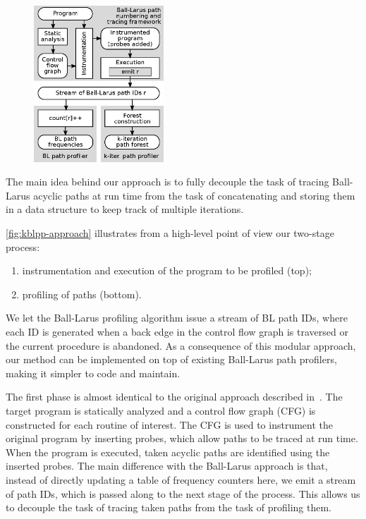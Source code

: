 \ifdefined\noauthorea
\begin{figure}
\vspace{-3mm}
\centering
\includegraphics[width=0.433\textwidth]{figures/kblpp-approach/kblpp-approach.eps}
\captionsetup{width=.47\textwidth}
\caption{\protect}
\end{figure}
\noindent
\fi

\vspace{-2mm}
\noindent The main idea behind our approach is to fully decouple the task of tracing Ball-Larus acyclic paths at run time from the task of concatenating and storing them in a data structure to keep track of multiple iterations.

\myfigure\ref{fig:kblpp-approach} illustrates from a high-level point of view our two-stage process:
\begin{enumerate}[parsep=0pt,itemsep=3pt,topsep=5pt]
\item instrumentation and execution of the program to be profiled (top);
\item profiling of paths (bottom).
\end{enumerate}
We let the Ball-Larus profiling algorithm issue a stream of BL path IDs, where each ID is generated when a back edge in the control flow graph is traversed or the current procedure is abandoned. As a consequence of this modular approach, our method can be implemented on top of existing Ball-Larus path profilers, making it simpler to code and maintain.


The first phase is almost identical to the original approach described in~\cite{Ball96}. The target program is statically analyzed and a control flow graph (CFG) is constructed for each routine of interest. The CFG is used to instrument the original program by inserting probes, which allow paths to be traced at run time. When the program is executed, taken acyclic paths are identified using the inserted probes. The main difference with the Ball-Larus approach is that, instead of directly updating a table of frequency counters here, we emit a stream of path IDs, which is passed along to the next stage of the process. This allows us to decouple the task of tracing taken paths from the task of profiling them.

